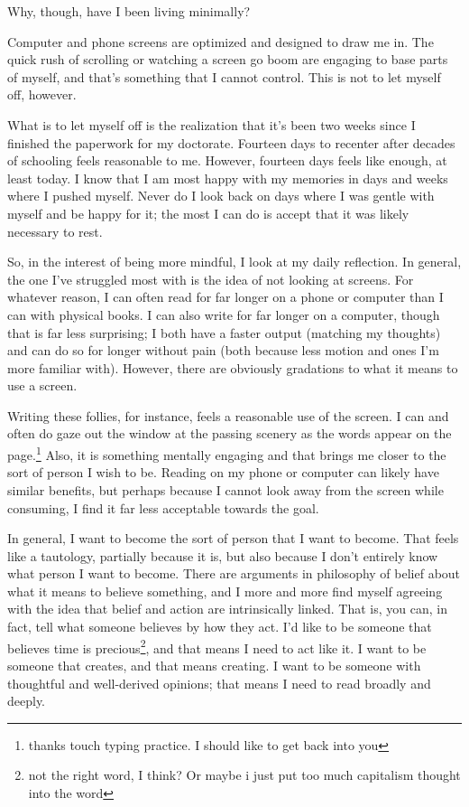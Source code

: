 \documentclass[12pt]{article}
\renewcommand{\,}{\textsuperscript{,}}
\begin{document}
Why, though, have I been living minimally?

Computer and phone screens are optimized and designed to draw me in.
The quick rush of scrolling or watching a screen go boom are engaging to base parts of myself, and that's something that I cannot control.
This is not to let myself off, however.

What is to let myself off is the realization that it's been two weeks since I finished the paperwork for my doctorate.
Fourteen days to recenter after decades of schooling feels reasonable to me.
However, fourteen days feels like enough, at least today.
I know that I am most happy with my memories in days and weeks where I pushed myself.
Never do I look back on days where I was gentle with myself and be happy for it; the most I can do is accept that it was likely necessary to rest.

So, in the interest of being more mindful, I look at my daily reflection.
In general, the one I've struggled most with is the idea of not looking at screens.
For whatever reason, I can often read for far longer on a phone or computer than I can with physical books.
I can also write for far longer on a computer, though that is far less surprising; I both have a faster output (matching my thoughts) and can do so for longer without pain (both because less motion and ones I'm more familiar with).
However, there are obviously gradations to what it means to use a screen.

Writing these follies, for instance, feels a reasonable use of the screen.
I can and often do gaze out the window at the passing scenery as the words appear on the page.\footnote{thanks touch typing practice. I should like to get back into you}
Also, it is something mentally engaging and that brings me closer to the sort of person I wish to be.
Reading on my phone or computer can likely have similar benefits, but perhaps because I cannot look away from the screen while consuming, I find it far less acceptable towards the goal.

In general, I want to become the sort of person that I want to become.
That feels like a tautology, partially because it is, but also because I don't entirely know what person I want to become.
There are arguments in philosophy of belief about what it means to believe something, and I more and more find myself agreeing with the idea that belief and action are intrinsically linked.
That is, you can, in fact, tell what someone believes by how they act.
I'd like to be someone that believes time is precious\footnote{not the right word, I think? Or maybe i just put too much capitalism thought into the word}, and that means I need to act like it.
I want to be someone that creates, and that means creating.
I want to be someone with thoughtful and well-derived opinions; that means I need to read broadly and deeply.
\end{document}
